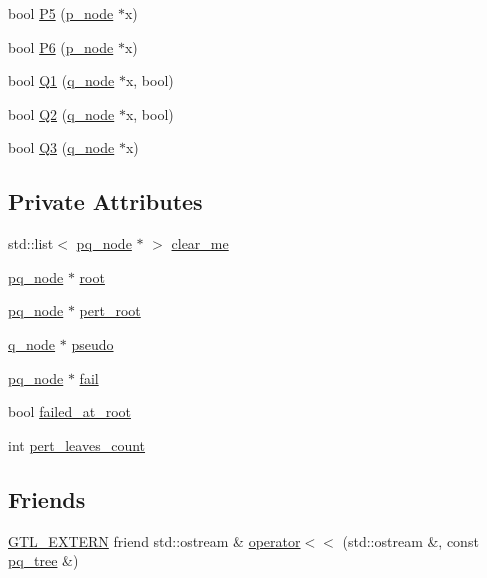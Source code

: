 \begin{DoxyCompactItemize}
\item 
bool \mbox{\hyperlink{classpq__tree_a274efe525064f511488091d318f1588e}{P5}} (\mbox{\hyperlink{classp__node}{p\+\_\+node}} $\ast$x)
\item 
bool \mbox{\hyperlink{classpq__tree_afbc208233ab34b2d0ed9e9a7fb5e19a7}{P6}} (\mbox{\hyperlink{classp__node}{p\+\_\+node}} $\ast$x)
\item 
bool \mbox{\hyperlink{classpq__tree_ab1c7266de209f9ac9f3267b4d8cafc48}{Q1}} (\mbox{\hyperlink{classq__node}{q\+\_\+node}} $\ast$x, bool)
\item 
bool \mbox{\hyperlink{classpq__tree_a76ca10878264d589c1a11f4f4bf93f83}{Q2}} (\mbox{\hyperlink{classq__node}{q\+\_\+node}} $\ast$x, bool)
\item 
bool \mbox{\hyperlink{classpq__tree_aaf2d4b1daf78f11cb3377d40a8125ac1}{Q3}} (\mbox{\hyperlink{classq__node}{q\+\_\+node}} $\ast$x)
\end{DoxyCompactItemize}
\subsection*{Private Attributes}
\begin{DoxyCompactItemize}
\item 
std\+::list$<$ \mbox{\hyperlink{classpq__node}{pq\+\_\+node}} $\ast$ $>$ \mbox{\hyperlink{classpq__tree_a43bcdb58d91b7e20860f523f49c74fd1}{clear\+\_\+me}}
\item 
\mbox{\hyperlink{classpq__node}{pq\+\_\+node}} $\ast$ \mbox{\hyperlink{classpq__tree_ad8e4e2235fe68fb99769cec54e1760ba}{root}}
\item 
\mbox{\hyperlink{classpq__node}{pq\+\_\+node}} $\ast$ \mbox{\hyperlink{classpq__tree_adf0d16ca5a29bfbe863efb525135ac01}{pert\+\_\+root}}
\item 
\mbox{\hyperlink{classq__node}{q\+\_\+node}} $\ast$ \mbox{\hyperlink{classpq__tree_a036ce0ebe9f5129d5c4ad930bbcc3e6f}{pseudo}}
\item 
\mbox{\hyperlink{classpq__node}{pq\+\_\+node}} $\ast$ \mbox{\hyperlink{classpq__tree_a4e0a0e6d74a8ac062acf3a05723a35f2}{fail}}
\item 
bool \mbox{\hyperlink{classpq__tree_a5ed4fd9eead5a983afc5e449debe73e2}{failed\+\_\+at\+\_\+root}}
\item 
int \mbox{\hyperlink{classpq__tree_a73eb0b66a10e300745e76df657767ef5}{pert\+\_\+leaves\+\_\+count}}
\end{DoxyCompactItemize}
\subsection*{Friends}
\begin{DoxyCompactItemize}
\item 
\mbox{\hyperlink{_g_t_l_8h_a014cd1e9b3e67a78ae433eda95c8fd25}{G\+T\+L\+\_\+\+E\+X\+T\+E\+RN}} friend std\+::ostream \& \mbox{\hyperlink{classpq__tree_a2db830bf75339bd39c819c231c03769b}{operator$<$$<$}} (std\+::ostream \&, const \mbox{\hyperlink{classpq__tree}{pq\+\_\+tree}} \&)
\end{DoxyCompactItemize}


